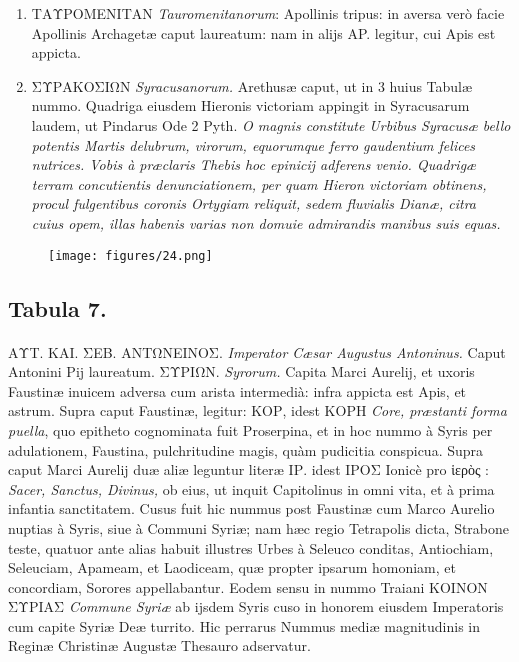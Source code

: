 \documentclass[a4paper, 11pt, oneside, polutonikogreek, latin]{article}
\begin{document}
\begin{enumerate}
    \item \foreignlanguage{greek}{ΤΑΥΡΟΜΕΝΙΤΑΝ} \emph{Tauromenitanorum}: Apollinis tripus: in aversa verò facie Apollinis Archagetæ caput laureatum: nam in alijs AP. legitur, cui Apis est appicta.

    \item \foreignlanguage{greek}{ΣΥΡΑΚΟΣΙΩΝ} \emph{Syracusanorum.} Arethusæ caput, ut in 3 huius Tabulæ nummo. Quadriga eiusdem Hieronis victoriam appingit in Syracusarum laudem, ut Pindarus Ode 2 Pyth. \emph{O magnis constitute Urbibus Syracusæ bello potentis Martis delubrum, virorum, equorumque ferro gaudentium felices nutrices. Vobis à præclaris Thebis hoc epinicij adferens venio. Quadrigæ terram concutientis denunciationem, per quam Hieron victoriam obtinens, procul fulgentibus coronis Ortygiam reliquit, sedem fluvialis Dianæ, citra cuius opem, illas habenis varias non domuie admirandis manibus suis equas.}
\end{enumerate}
\clearpage
\vspace*{\fill}
\begin{figure}[H]
\centering
\texttt{[image: figures/24.png]}
\end{figure}
\vspace*{\fill}
\clearpage
\subsection*{Tabula 7.}
\paragraph{}
\foreignlanguage{greek}{ΑΥΤ. ΚΑΙ. ΣΕΒ. ΑΝΤΩΝΕΙΝΟΣ}. \emph{Imperator Cæsar Augustus Antoninus.} Caput Antonini Pij laureatum. \foreignlanguage{greek}{ΣΥΡΙΩΝ}. \emph{Syrorum.} Capita Marci Aurelij, et uxoris Faustinæ inuicem adversa cum arista intermedià: infra appicta est Apis, et astrum. Supra caput Faustinæ, legitur: \foreignlanguage{greek}{ΚΟΡ}, idest \foreignlanguage{greek}{ΚΟΡΗ} \emph{Core, præstanti forma puella}, quo epitheto cognominata fuit Proserpina, et in hoc nummo à Syris per adulationem, Faustina, pulchritudine magis, quàm pudicitia conspicua. Supra caput Marci Aurelij duæ aliæ leguntur literæ \foreignlanguage{greek}{ΙΡ}. idest \foreignlanguage{greek}{ΙΡΟΣ} Ionicè pro ἱερὸς : \emph{Sacer, Sanctus, Divinus,} ob eius, ut inquit Capitolinus in omni vita, et à prima infantia sanctitatem. Cusus fuit hic nummus post Faustinæ cum Marco Aurelio nuptias à Syris, siue à Communi Syriæ; nam hæc regio Tetrapolis dicta, Strabone teste, quatuor ante alias habuit illustres Urbes à Seleuco conditas, Antiochiam, Seleuciam, Apameam, et Laodiceam, quæ propter ipsarum homoniam, et concordiam, Sorores appellabantur. Eodem sensu in nummo Traiani \foreignlanguage{greek}{ΚΟΙΝΟΝ ΣΥΡΙΑΣ} \emph{Commune Syriæ} ab ijsdem Syris cuso in honorem eiusdem Imperatoris cum capite Syriæ Deæ turrito. Hic perrarus Nummus mediæ magnitudinis in Reginæ Christinæ Augustæ Thesauro adservatur.
\end{document}

